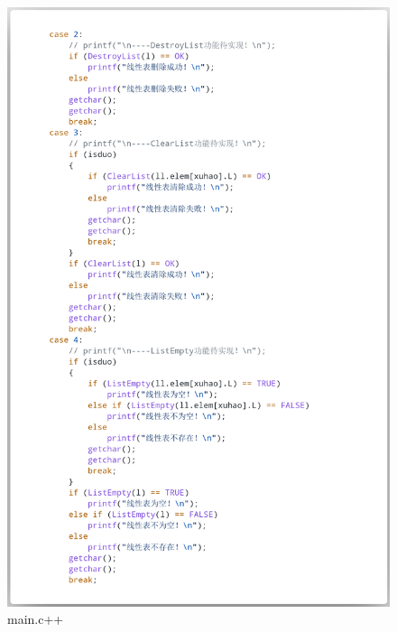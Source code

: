 \documentclass[supercite]{Experimental_Report}
\theoremstyle{definition}
\begin{document}
\begin{figure}[htb]
	\begin{center}
		\includegraphics[scale=0.30]{images/3-10.png}
		\caption{main.c++}
		\label{fig3-10}
	\end{center}
\end{figure}
\end{document}
